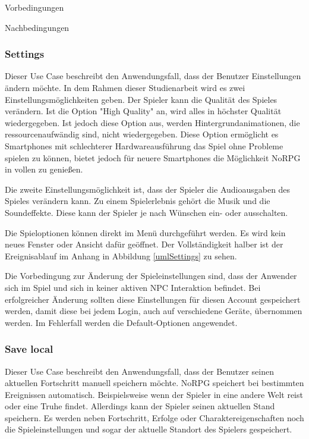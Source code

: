 			
		
			Vorbedingungen
		
			Nachbedingungen
		
		\subsubsection{Settings}
			Dieser Use Case beschreibt den Anwendungsfall, dass der Benutzer Einstellungen ändern möchte. In dem Rahmen dieser Studienarbeit wird es zwei Einstellungsmöglichkeiten geben. Der Spieler kann die Qualität des Spieles verändern. Ist die Option "High Quality" an, wird alles in höchster Qualität wiedergegeben. Ist jedoch diese Option aus, werden Hintergrundanimationen, die ressourcenaufwändig sind, nicht wiedergegeben. Diese Option ermöglicht es Smartphones mit schlechterer Hardwareausführung das Spiel ohne Probleme spielen zu können, bietet jedoch für neuere Smartphones die Möglichkeit NoRPG in vollen zu genießen.
			
			Die zweite Einstellungsmöglichkeit ist, dass der Spieler die Audioausgaben des Spieles verändern kann. Zu einem Spielerlebnis gehört die Musik und die Soundeffekte. Diese kann der Spieler je nach Wünschen ein- oder ausschalten.
			
			Die Spieloptionen können direkt im Menü durchgeführt werden. Es wird kein neues Fenster oder Ansicht dafür geöffnet. Der Vollständigkeit  halber ist der Ereignisablauf im Anhang in Abbildung \ref{umlSettings} zu sehen.
	
			Die Vorbedingung zur Änderung der Spieleinstellungen sind, dass der Anwender sich im Spiel und sich in keiner aktiven NPC Interaktion befindet. Bei erfolgreicher Änderung sollten diese Einstellungen für diesen Account gespeichert werden, damit diese bei jedem Login, auch auf verschiedene Geräte, übernommen werden. Im Fehlerfall werden die Default-Optionen angewendet. 
	
		\subsubsection{Save local}
			Dieser Use Case beschreibt den Anwendungsfall, dass der Benutzer seinen aktuellen Fortschritt manuell speichern möchte. NoRPG speichert bei bestimmten Ereignissen automatisch. Beispielsweise wenn der Spieler in eine andere Welt reist oder eine Truhe findet. Allerdings kann der Spieler seinen aktuellen Stand speichern. Es werden neben Fortschritt, Erfolge oder Charaktereigenschaften noch die Spieleinstellungen und sogar der aktuelle Standort des Spielers gespeichert.
			
